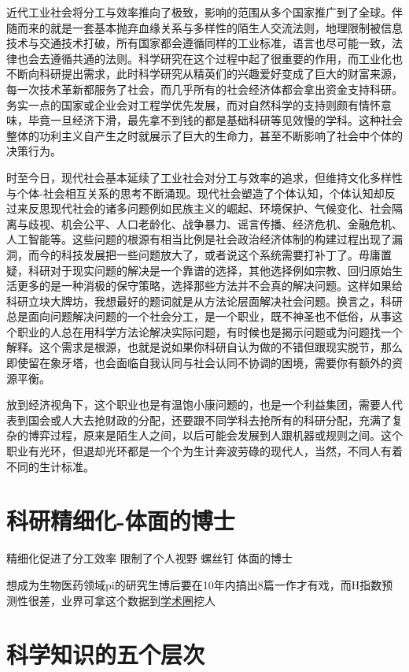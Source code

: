 \documentclass[]{book}
\begin{document}
近代工业社会将分工与效率推向了极致，影响的范围从多个国家推广到了全球。伴随而来的就是一套基本抛弃血缘关系与多样性的陌生人交流法则，地理限制被信息技术与交通技术打破，所有国家都会遵循同样的工业标准，语言也尽可能一致，法律也会去遵循共通的法则。科学研究在这个过程中起了很重要的作用，而工业化也不断向科研提出需求，此时科学研究从精英们的兴趣爱好变成了巨大的财富来源，每一次技术革新都服务了社会，而几乎所有的社会经济体都会拿出资金支持科研。务实一点的国家或企业会对工程学优先发展，而对自然科学的支持则颇有情怀意味，毕竟一旦经济下滑，最先拿不到钱的都是基础科研等见效慢的学科。这种社会整体的功利主义自产生之时就展示了巨大的生命力，甚至不断影响了社会中个体的决策行为。

时至今日，现代社会基本延续了工业社会对分工与效率的追求，但维持文化多样性与个体-社会相互关系的思考不断涌现。现代社会塑造了个体认知，个体认知却反过来反思现代社会的诸多问题例如民族主义的崛起、环境保护、气候变化、社会隔离与歧视、机会公平、人口老龄化、战争暴力、谣言传播、经济危机、金融危机、人工智能等。这些问题的根源有相当比例是社会政治经济体制的构建过程出现了漏洞，而今的科技发展把一些问题放大了，或者说这个系统需要打补丁了。毋庸置疑，科研对于现实问题的解决是一个靠谱的选择，其他选择例如宗教、回归原始生活更多的是一种消极的保守策略，选择那些方法并不会真的解决问题。这样如果给科研立块大牌坊，我想最好的题词就是从方法论层面解决社会问题。换言之，科研总是面向问题解决问题的一个社会分工，是一个职业，既不神圣也不低俗，从事这个职业的人总在用科学方法论解决实际问题，有时候也是揭示问题或为问题找一个解释。这个需求是根源，也就是说如果你科研自认为做的不错但跟现实脱节，那么即使留在象牙塔，也会面临自我认同与社会认同不协调的困境，需要你有额外的资源平衡。

放到经济视角下，这个职业也是有温饱小康问题的，也是一个利益集团，需要人代表到国会或人大去抢财政的分配，还要跟不同学科去抢所有的科研分配，充满了复杂的博弈过程，原来是陌生人之间，以后可能会发展到人跟机器或规则之间。这个职业有光环，但退却光环都是一个个为生计奔波劳碌的现代人，当然，不同人有着不同的生计标准。

\section{科研精细化-体面的博士}\label{-}

精细化促进了分工效率 限制了个人视野 螺丝钉 体面的博士

想成为生物医药领域pi的研究生博后要在10年内搞出8篇一作才有戏，而H指数预测性很差，业界可拿这个数据到\href{https://peerj.com/articles/1262/}{学术圈}挖人

\section{科学知识的五个层次}
\end{document}
